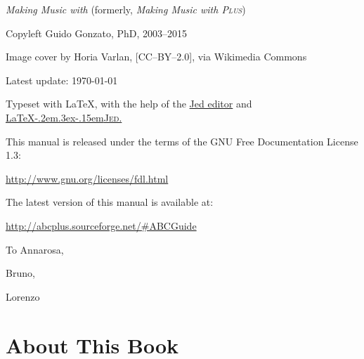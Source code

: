 \documentclass[a4paper,12pt]{book}
\begin{document}

\thispagestyle{empty}
\pagecolor{white}
\null
\vfill

\textit{Making Music with \ABCPLUS}
(formerly, \textit{Making Music with \ABC{} \textsc{Plus}})

Copyleft \textcopyright{} Guido Gonzato, PhD, 2003--2015

Image cover by Horia Varlan, [CC--BY--2.0], via Wikimedia Commons

Latest update: \today

Typeset with \LaTeX, with the help of the
\href{http://www.jedsoft.org/jed/}{Jed editor} and
\href{http://www.ctan.org/pkg/latex4jed}{
{\LaTeX\kern-.2em\raise.3ex\hbox{}\kern-.15em\textsc{Jed.}}
}

This manual is released under the terms of the GNU Free Documentation
License 1.3:

\url{http://www.gnu.org/licenses/fdl.html}

\bigskip

The latest version of this manual is available at:

\url{http://abcplus.sourceforge.net/#ABCGuide}

\newpage


\thispagestyle{empty}
\null
\vfill

{\large
\begin{flushright}
\begin{itshape}
To Annarosa,

Bruno,

Lorenzo

\Heart

\end{itshape}
\end{flushright}
}

\vfill
\null
\newpage


\thispagestyle{empty} %
\setcounter{page}{4}
\pagestyle{plain}


\tableofcontents
\listoftables
\listoffigures


\chapter{About This Book}
\end{document}
